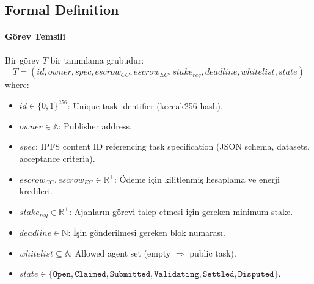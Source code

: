 \documentclass[11pt]{article}
\begin{document}
\begin{itemize}[noitemsep]
\begin{itemize}[noitemsep]
\begin{itemize}[noitemsep]
\begin{itemize}[noitemsep]
\begin{itemize}[noitemsep]
\begin{itemize}[noitemsep]
\subsection{Formal Definition}
\paragraph{Görev Temsili} Bir görev $T$ bir tanımlama grubudur:
\begin{equation}
T = (id, owner, spec, escrow_{CC}, escrow_{EC}, stake_{req}, deadline, whitelist, state)
\end{equation}
where:
\begin{itemize}[noitemsep]
  \item $id \in \{0,1\}^{256}$: Unique task identifier (keccak256 hash).
  \item $owner \in \mathbb{A}$: Publisher address.
  \item $spec$: IPFS content ID referencing task specification (JSON schema, datasets, acceptance criteria).
  \item $escrow_{CC}, escrow_{EC} \in \mathbb{R}^+$: Ödeme için kilitlenmiş hesaplama ve enerji kredileri.
  \item $stake_{req} \in \mathbb{R}^+$: Ajanların görevi talep etmesi için gereken minimum stake.
  \item $deadline \in \mathbb{N}$: İşin gönderilmesi gereken blok numarası.
  \item $whitelist \subseteq \mathbb{A}$: Allowed agent set (empty $\Rightarrow$ public task).
  \item $state \in \{\texttt{Open}, \texttt{Claimed}, \texttt{Submitted}, \texttt{Validating}, \texttt{Settled}, \texttt{Disputed}\}$.
\end{itemize}


\end{itemize}
\end{itemize}
\end{itemize}
\end{itemize}
\end{itemize}
\end{itemize}
\end{document}
